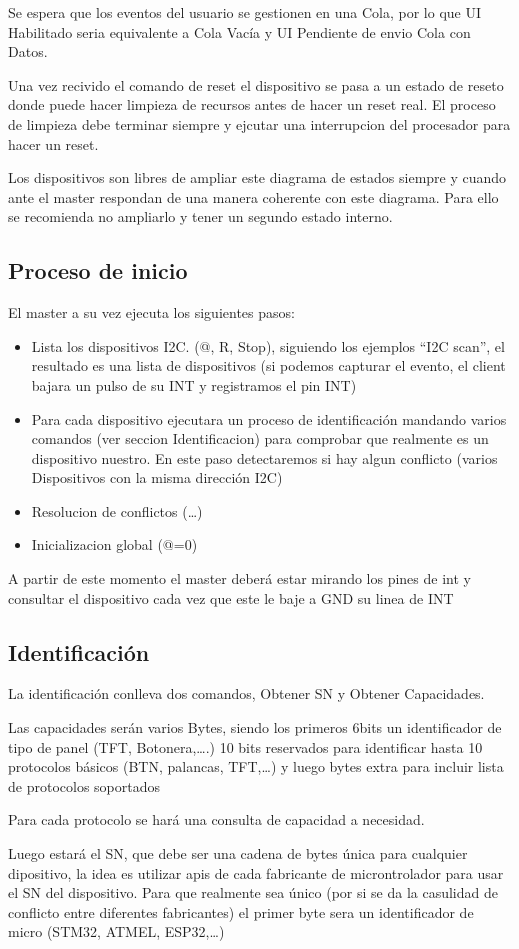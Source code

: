 Se espera que los eventos del usuario se gestionen en una Cola, por lo que UI Habilitado seria equivalente a
Cola Vacía  y UI Pendiente de envio Cola con Datos.

Una vez recivido el comando de reset el dispositivo se pasa a un estado de reseto donde puede hacer limpieza
de recursos antes de hacer un reset real. El proceso de limpieza debe terminar siempre y ejcutar una
interrupcion del procesador para hacer un reset.

Los dispositivos son libres de ampliar este diagrama de estados siempre y cuando ante el master respondan de
una manera coherente con este diagrama. Para ello se recomienda no ampliarlo y tener un segundo estado interno.

\subsection{Proceso de inicio}
El master a su vez ejecuta los siguientes pasos:
\begin{itemize}
    \item{} Lista los dispositivos I2C. (@, R, Stop), siguiendo los ejemplos “I2C scan”, el resultado es una lista
          de dispositivos (si podemos capturar el evento, el client bajara un pulso de su INT y registramos el pin INT)
    \item{} Para cada dispositivo ejecutara un proceso de identificación mandando varios comandos (ver seccion
          Identificacion) para comprobar que realmente es un dispositivo nuestro. En este
          paso detectaremos si hay algun conflicto (varios Dispositivos con la misma dirección I2C)
    \item{} Resolucion de conflictos (…)
    \item{} Inicializacion global (@=0)
\end{itemize}
A partir de este momento el master deberá estar mirando los pines de int y consultar el dispositivo cada vez que
este le baje a GND su linea de INT

\subsection{Identificación}
La identificación conlleva dos comandos, Obtener SN y Obtener Capacidades.

Las capacidades serán varios Bytes, siendo los primeros 6bits un identificador de tipo de panel (TFT, Botonera,….) 10 bits reservados para identificar hasta 10 protocolos básicos
(BTN, palancas, TFT,…) y luego bytes extra para incluir lista de protocolos soportados

Para cada protocolo se hará una consulta de capacidad a necesidad.

Luego estará el SN, que debe ser una cadena de bytes única para cualquier dipositivo, la idea es utilizar apis
de cada fabricante de microntrolador para usar el SN del dispositivo. Para que realmente sea único (por si
se da la casulidad de conflicto entre diferentes fabricantes) el primer byte sera un identificador de micro
(STM32, ATMEL, ESP32,…)
